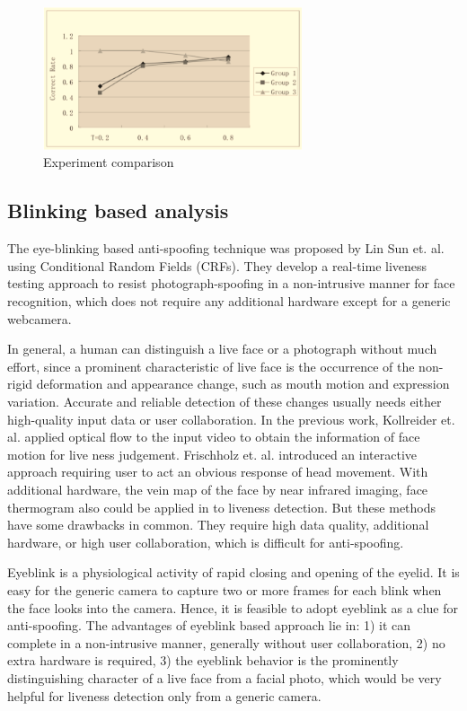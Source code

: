 \documentclass[journal]{IEEEtran}
\begin{document}
\begin{figure}[!t]
\centering
\includegraphics[width=3in]{img/C_2}
\caption{Experiment comparison}
\label{fig_C_2}
\end{figure}

\subsection{Blinking based analysis}

The eye-blinking based anti-spoofing technique was proposed by Lin Sun et. al. \cite{pan2007eyeblink} using Conditional Random Fields (CRFs). They develop a real-time liveness testing approach to resist photograph-spoofing in a non-intrusive manner for face recognition, which does not require any additional hardware except for a generic webcamera.

In general, a human can distinguish a live face or a photograph without much effort, since a prominent characteristic of live face is the occurrence of the non-rigid deformation and appearance change, such as mouth motion and expression variation. Accurate and reliable detection of these changes usually needs either high-quality input data or user collaboration. In the previous work, Kollreider et. al. \cite{kollreider2005evaluating} applied optical flow to the input video to obtain the information of face motion for live ness judgement. Frischholz et. al. \cite{frischholz2003avoiding} introduced an interactive approach requiring user to act an obvious response of head movement. With additional hardware, the vein map of the face by near infrared imaging, face thermogram \cite{socolinsky2003face} also could be applied in to liveness detection. But these methods have some drawbacks in common. They require high data quality, additional hardware, or high user collaboration, which is difficult for anti-spoofing.

Eyeblink is a physiological activity of rapid closing and opening of the eyelid. It is easy for the generic camera to capture two or more frames for each blink when the face looks into the camera. Hence, it is feasible to adopt eyeblink as a clue for anti-spoofing. The advantages of eyeblink based approach lie in: 1) it can complete in a non-intrusive manner, generally without user collaboration, 2) no extra hardware is required, 3) the eyeblink behavior is the prominently distinguishing character of a live face from a facial photo, which would be very helpful for liveness detection only from a generic camera.
\end{document}
